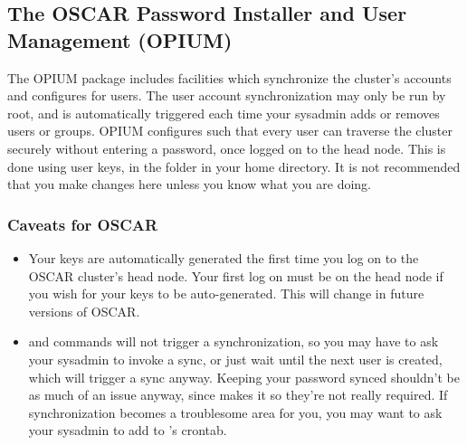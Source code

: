 %
%
%

\subsection{The OSCAR Password Installer and User Management (OPIUM)}
\label{app:opium-overview}

The OPIUM package includes facilities which synchronize the cluster's
accounts and configures  for users.  The user account
synchronization may only be run by root, and is automatically
triggered each time your sysadmin adds or removes users or groups.
OPIUM configures  such that every user can traverse the
cluster securely without entering a password, once logged on to the
head node.  This is done using  user keys, in the 
folder in your home directory.  It is not recommended that you make
changes here unless you know what you are doing.

\subsubsection{Caveats for OSCAR \oscarversion}

\begin{itemize}
\item Your  keys are automatically generated the first time
  you log on to the OSCAR cluster's head node.  Your first log on must
  be on the head node if you wish for your  keys to be
  auto-generated.  This will change in future versions of OSCAR.
  
\item {} and  commands will not trigger a
  synchronization, so you may have to ask your sysadmin to invoke a
  sync, or just wait until the next user is created, which will
  trigger a sync anyway.  Keeping your password synced shouldn't be as
  much of an issue anyway, since  makes it so they're not
  really required.  If synchronization becomes a troublesome area for
  you, you may want to ask your sysadmin to add  to
  's crontab.
\end{itemize}

